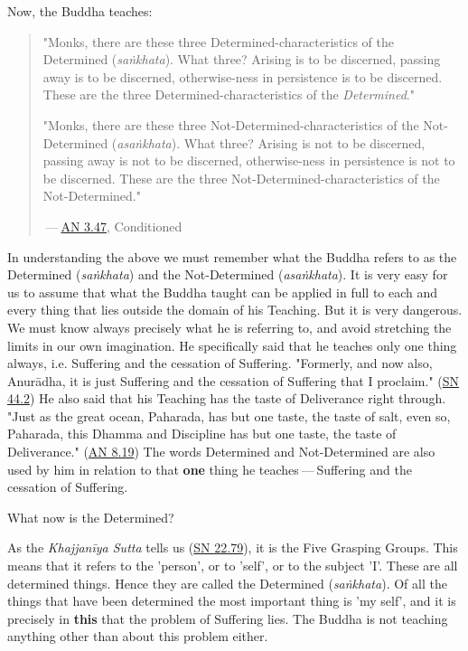 Now, the Buddha teaches:


\begin{quotation}
"Monks, there are these three
Determined-characteristics of the Determined (\emph{saṅkhata}). What
three? Arising is to be discerned, passing away is to be discerned,
otherwise-ness in persistence is to be discerned. These are the three
Determined-characteristics of the \emph{Determined}."


"Monks, there are these three Not-Determined-characteristics
of the Not-Determined (\emph{asaṅkhata}). What three? Arising is not to
be discerned, passing away is not to be discerned, otherwise-ness in
persistence is not to be discerned. These are the three
Not-Determined-characteristics of the Not-Determined."


 — \href{https://suttacentral.net/an3.47/en/bodhi}{AN 3.47}, Conditioned


\end{quotation}

In understanding the above we must remember what the Buddha refers to as
the Determined (\emph{saṅkhata}) and the Not-Determined (\emph{asaṅkhata}).
It is very easy for us to assume that what the Buddha
taught can be applied in full to each and every thing that lies outside
the domain of his Teaching. But it is very dangerous. We must know
always precisely what he is referring to, and avoid stretching the
limits in our own imagination. He specifically said that he teaches only
one thing always, i.e. Suffering and the cessation of Suffering.
"Formerly, and now also, Anurādha, it is just Suffering and the
cessation of Suffering that I proclaim." (\href{https://suttacentral.net/sn44.2/en/sujato}{SN 44.2})
He also said that his Teaching has the
taste of Deliverance right through. "Just as the great ocean, Paharada,
has but one taste, the taste of salt, even so, Paharada, this Dhamma and
Discipline has but one taste, the taste of
Deliverance." (\href{https://suttacentral.net/an8.19/en/bodhi}{AN 8.19}) The words Determined and Not-Determined are also
used by him in relation to that \textbf{one} thing he teaches — Suffering and
the cessation of Suffering.


What now is the Determined?


As the \emph{Khajjanīya Sutta} tells us (\href{https://suttacentral.net/sn22.79/en/bodhi}{SN 22.79}), it is the Five Grasping Groups. This
means that it refers to the 'person', or to 'self', or to the subject
'I'. These are all determined things. Hence they are called the
Determined (\emph{saṅkhata}). Of all the things that have been determined
the most important thing is 'my self', and it is precisely in \textbf{this}
that the problem of Suffering lies. The Buddha is not teaching anything
other than about this problem either.


